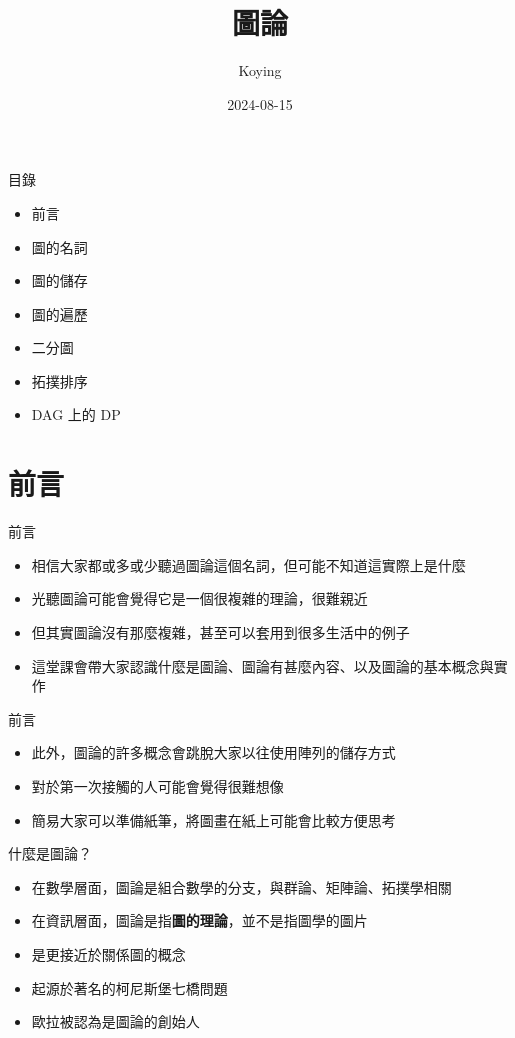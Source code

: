 \documentclass[aspectratio=169]{beamer}
\title{圖論}
\author{Koying}
\date{2024-08-15}
\begin{document}
    \begin{frame}
        \titlepage
    \end{frame}

    \begin{frame}{目錄}
        \begin{itemize}
            \item 前言
            \item 圖的名詞
            \item 圖的儲存
            \item 圖的遍歷
            \item 二分圖
            \item 拓撲排序
            \item DAG 上的 DP
        \end{itemize}
    \end{frame}

    \section{前言}

    \begin{frame}{前言}
        \begin{itemize}
            \item 相信大家都或多或少聽過圖論這個名詞，但可能不知道這實際上是什麼
            \item 光聽圖論可能會覺得它是一個很複雜的理論，很難親近
            \item 但其實圖論沒有那麼複雜，甚至可以套用到很多生活中的例子
            \item 這堂課會帶大家認識什麼是圖論、圖論有甚麼內容、以及圖論的基本概念與實作
        \end{itemize}
    \end{frame}

    \begin{frame}{前言}
        \begin{itemize}
            \item 此外，圖論的許多概念會跳脫大家以往使用陣列的儲存方式
            \item 對於第一次接觸的人可能會覺得很難想像
            \item 簡易大家可以準備紙筆，將圖畫在紙上可能會比較方便思考
        \end{itemize}
    \end{frame}


    \begin{frame}{什麼是圖論？}
        \begin{itemize}
            \item<1-> 在數學層面，圖論是組合數學的分支，與群論、矩陣論、拓撲學相關
            \item<2-> 在資訊層面，圖論是指\textbf{圖的理論}，並不是指圖學的圖片
            \item<3-> 是更接近於關係圖的概念
            \item<4-> 起源於著名的柯尼斯堡七橋問題
            \item<5-> 歐拉被認為是圖論的創始人
        \end{itemize}
    \end{frame}
\end{document}
